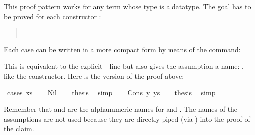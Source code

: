 \begin{isabellebody}
\begin{isamarkuptext}
This proof pattern works for any term  whose type is a datatype.
The goal has to be proved for each constructor :
\begin{quote}
 \   
\end{quote}
Each case can be written in a more compact form by means of the 
command:
\begin{quote}
 
\end{quote}
This is equivalent to the explicit - line
but also gives the assumption  a name: ,
like the constructor.
Here is the  version of the proof above:%
\end{isamarkuptext}%
\isamarkuptrue%
%
\isadelimproof
%
\endisadelimproof
%
\isatagproof
{}\isamarkupfalse%
\ {}cases\ xs{}\isanewline
\ \ \isamarkupfalse%
\ Nil\isanewline
\ \ \isamarkupfalse%
\ {}thesis\ \isamarkupfalse%
\ simp\isanewline
{}\isamarkupfalse%
\isanewline
\ \ \isamarkupfalse%
\ {}Cons\ y\ ys{}\isanewline
\ \ \isamarkupfalse%
\ {}thesis\ \isamarkupfalse%
\ simp\isanewline
{}\isamarkupfalse%
%
\endisatagproof
{\isafoldproof}%
%
\isadelimproof
%
\endisadelimproof
%
\begin{isamarkuptext}%
Remember that  and  are the alphanumeric names
for  and . The names of the assumptions
are not used because they are directly piped (via )
into the proof of the claim.


\end{isamarkuptext}
\end{isabellebody}
